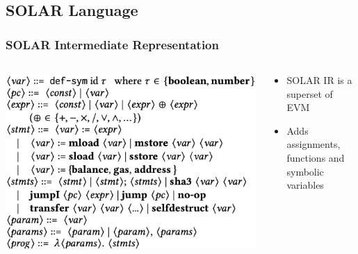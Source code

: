 \documentclass{beamer}
\begin{document}
\subsection{SOLAR Language}
\begin{frame}
  \frametitle{SOLAR Intermediate Representation}
  \begin{columns}[T]
    \begin{column}{0.5\textwidth}
      \includegraphics[scale=0.35]{IRGrammar}
    \end{column}
    \pause
    \begin{column}{0.5\textwidth}
      \begin{itemize}
      \item SOLAR IR is a superset of EVM
      \item Adds assignments, functions and symbolic
        variables
      \end{itemize}
    \end{column}
  \end{columns}
\end{frame}
\end{document}

